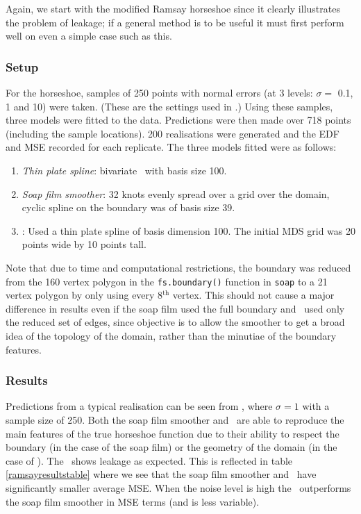 Again, we start with the modified Ramsay horseshoe since it clearly illustrates the problem of leakage; if a general method is to be useful it must first perform well on even a simple case such as this.

\subsubsection{Setup}

For the horseshoe, samples of 250 points with normal errors (at 3 levels:  $\sigma= $ 0.1, 1 and 10) were taken. (These are the settings used in \cite{soap}.) Using these samples, three models were fitted to the data. Predictions were then made over 718 points (including the sample locations). 200 realisations were generated and the EDF and MSE recorded for each replicate. The three models fitted were as follows:

\begin{enumerate}
\item \emph{Thin plate spline}: bivariate \tprs\  with basis size 100.
\item \emph{Soap film smoother}: 32 knots evenly spread over a grid over the domain, cyclic spline on the boundary was of basis size 39.
\item \emph{\mdsap}: Used a thin plate spline of basis dimension 100. The initial MDS grid was 20 points wide by 10 points tall.
\end{enumerate} 

Note that due to time and computational restrictions, the boundary was reduced from the 160 vertex polygon in the \texttt{fs.boundary()} function in \texttt{soap} to a 21 vertex polygon by only using every 8$^\text{th}$ vertex. This should not cause a major difference in results even if the soap film used the full boundary and \mdsap\ used only the reduced set of edges, since objective is to allow the smoother to get a broad idea of the topology of the domain, rather than the minutiae of the boundary features.

\subsubsection{Results}

Predictions from a typical realisation can be seen from , where $\sigma=1$ with a sample size of 250. Both the soap film smoother and \mdsap\ are able to reproduce the main features of the true horseshoe function due to their ability to respect the boundary (in the case of the soap film) or the geometry of the domain (in the case of \mdsap). The \tprs\ shows leakage as expected. This is reflected in table \ref{ramsayresultstable} where we see that the soap film smoother and \mdsap\ have significantly smaller average MSE. When the noise level is high the \mdsap\ outperforms the soap film smoother in MSE terms (and is less variable).

